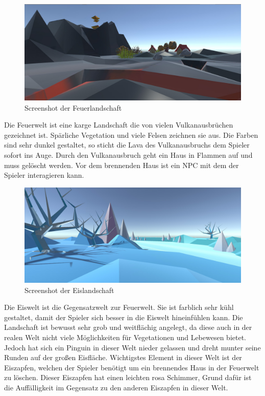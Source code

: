 
\begin{figure}[!htbp]%
	\centering
		\includegraphics[width=1.0\textwidth]{images/Feuer}
	\caption{Screenshot der Feuerlandschaft}
	\label{fig:Feuer}
\end{figure}

Die Feuerwelt ist eine karge Landschaft die von vielen Vulkanausbrüchen gezeichnet ist. Spärliche Vegetation und viele Felsen zeichnen sie aus.  Die Farben sind sehr dunkel gestaltet, so sticht die Lava des Vulkanausbruchs dem Spieler sofort ins Auge. Durch den Vulkanausbruch geht ein Haus in Flammen auf und muss gelöscht werden. Vor dem brennenden Haus ist ein NPC mit dem der Spieler interagieren kann.


\begin{figure}[!htbp]
	\centering
		\includegraphics[width=1.0\textwidth]{images/Eis}
	\caption{Screenshot der Eislandschaft}
	\label{fig:Eis}
\end{figure}

Die Eiswelt ist die Gegensatzwelt zur Feuerwelt. Sie ist farblich sehr kühl gestaltet, damit der Spieler sich besser in die Eiswelt hineinfühlen kann. Die Landschaft ist bewusst sehr grob und weitflächig angelegt, da diese auch in der realen Welt nicht viele Möglichkeiten für Vegetationen und Lebewesen bietet. Jedoch hat sich ein Pinguin in dieser Welt nieder gelassen und dreht munter seine Runden auf der großen Eisfläche. Wichtigstes Element in dieser Welt ist der Eiszapfen, welchen der Spieler benötigt um ein brennendes Haus in der Feuerwelt zu löschen. Dieser Eiszapfen hat einen leichten rosa Schimmer, Grund dafür ist die Auffälligkeit im Gegensatz zu den anderen Eiszapfen in dieser Welt.

